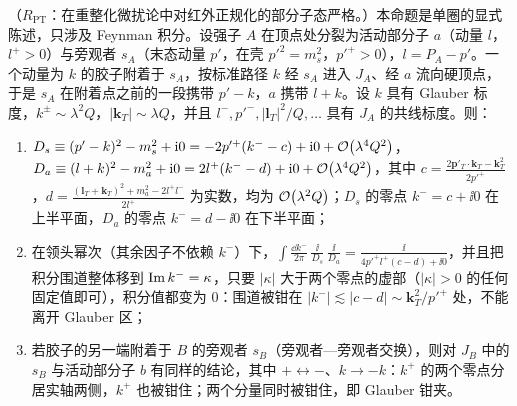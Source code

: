 \begin{proposition}\label{prop:dy-glauber-pinch}
（$R_{\mathrm{PT}}$：在重整化微扰论中对红外正规化的部分子态严格。）本命题是单圈的显式陈述，只涉及 Feynman 积分。设强子 $A$ 在顶点处分裂为活动部分子 $a$（动量 $l$，$l^+>0$）与旁观者 $s_A$（末态动量 $p'$，在壳 $p'^2=m_s^2$，$p'^+>0$），$l=P_A-p'$。一个动量为 $k$ 的胶子附着于 $s_A$，按标准路径 $k$ 经 $s_A$ 进入 $J_A$、经 $a$ 流向硬顶点，于是 $s_A$ 在附着点之前的一段携带 $p'-k$，$a$ 携带 $l+k$。设 $k$ 具有 Glauber 标度，$k^\pm\sim\lambda^2Q$，$|\mathbf k_T|\sim\lambda Q$，并且 $l^-,p'^-,|\mathbf l_T|^2/Q,\dots$ 具有 $J_A$ 的共线标度。则：
\begin{enumerate}[label=(\alph*),leftmargin=2.2em,itemsep=1pt,topsep=2pt]
\item $D_s\equiv(p'-k)^2-m_s^2+\mathrm{i}0=-2p'^+(k^--c)+\mathrm{i}0+\mathcal{O}\!\left(\lambda^4Q^2\right)$，$D_a\equiv(l+k)^2-m_a^2+\mathrm{i}0=2l^+(k^--d)+\mathrm{i}0+\mathcal{O}\!\left(\lambda^4Q^2\right)$，其中
$c=\frac{2\mathbf p'_T\cdot\mathbf k_T-\mathbf k_T^2}{2p'^+}$，$d=\frac{(\mathbf l_T+\mathbf k_T)^2+m_a^2-2l^+l^-}{2l^+}$ 为实数，均为 $\mathcal{O}\!\left(\lambda^2Q\right)$；$D_s$ 的零点 $k^-=c+\ii0$ 在上半平面，$D_a$ 的零点 $k^-=d-\ii0$ 在下半平面；
\item 在领头幂次（其余因子不依赖 $k^-$）下，$\displaystyle\int\frac{\dd k^-}{2\pi}\,\frac{\ii}{D_s}\,\frac{\ii}{D_a}=\frac{\ii}{4p'^+l^+(c-d)+\ii0}$，并且把积分围道整体移到 $\operatorname{Im} k^-=\kappa$，只要 $|\kappa|$ 大于两个零点的虚部（$|\kappa|>0$ 的任何固定值即可），积分值都变为 $0$：围道被钳在 $|k^-|\lesssim|c-d|\sim\mathbf k_T^2/p'^+$ 处，不能离开 Glauber 区；
\item 若胶子的另一端附着于 $B$ 的旁观者 $s_B$（旁观者—旁观者交换），则对 $J_B$ 中的 $s_B$ 与活动部分子 $b$ 有同样的结论，其中 $+\leftrightarrow-$、$k\to-k$：$k^+$ 的两个零点分居实轴两侧，$k^+$ 也被钳住；两个分量同时被钳住，即 Glauber 钳夹。
\end{enumerate}
\end{proposition}

